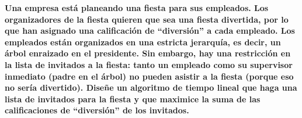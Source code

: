 \textbf{Una empresa est\'a planeando una fiesta para sus empleados. Los organizadores de la fiesta quieren que sea una fiesta divertida, por lo que han asignado una calificaci\'on de ``diversi\'on'' a cada empleado. Los empleados est\'an organizados en una estricta jerarqu\'ia, es decir, un \'arbol enraizado en el presidente. Sin embargo, hay una restricci\'on en la lista de invitados a la fiesta: tanto un empleado como su supervisor inmediato (padre en el \'arbol) no pueden asistir a la fiesta (porque eso no ser\'ia divertido). Dise\~ne un algoritmo de tiempo lineal que haga una lista de invitados para la fiesta y que maximice la suma de las calificaciones de ``diversi\'on'' de los invitados.}\vspace{.2cm}

\textcolor{bibi}{}
\begin{quote}
\end{quote}